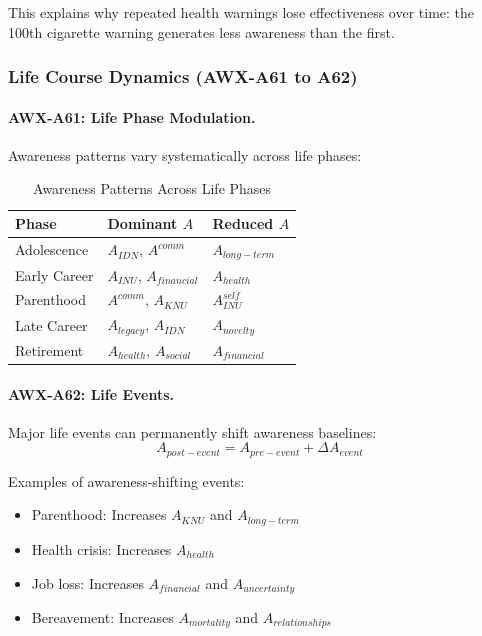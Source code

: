 This explains why repeated health warnings lose effectiveness over time: 
the 100th cigarette warning generates less awareness than the first.

\subsubsection{Life Course Dynamics (AWX-A61 to A62)}

\paragraph{AWX-A61: Life Phase Modulation.}
Awareness patterns vary systematically across life phases:

\begin{table}[htbp]
\centering
\caption{Awareness Patterns Across Life Phases}
\label{tab:life-phases}
\begin{tabular}{@{}lll@{}}
\toprule
\textbf{Phase} & \textbf{Dominant $A$} & \textbf{Reduced $A$} \\
\midrule
Adolescence & $A_{IDN}$, $A^{comm}$ & $A_{long-term}$ \\
Early Career & $A_{INU}$, $A_{financial}$ & $A_{health}$ \\
Parenthood & $A^{comm}$, $A_{KNU}$ & $A^{self}_{INU}$ \\
Late Career & $A_{legacy}$, $A_{IDN}$ & $A_{novelty}$ \\
Retirement & $A_{health}$, $A_{social}$ & $A_{financial}$ \\
\bottomrule
\end{tabular}
\end{table}

\paragraph{AWX-A62: Life Events.}
Major life events can permanently shift awareness baselines:
\begin{equation}
A_{post-event} = A_{pre-event} + \Delta A_{event}
\end{equation}

Examples of awareness-shifting events:
\begin{itemize}
    \item Parenthood: Increases $A_{KNU}$ and $A_{long-term}$
    \item Health crisis: Increases $A_{health}$
    \item Job loss: Increases $A_{financial}$ and $A_{uncertainty}$
    \item Bereavement: Increases $A_{mortality}$ and $A_{relationships}$
\end{itemize}

